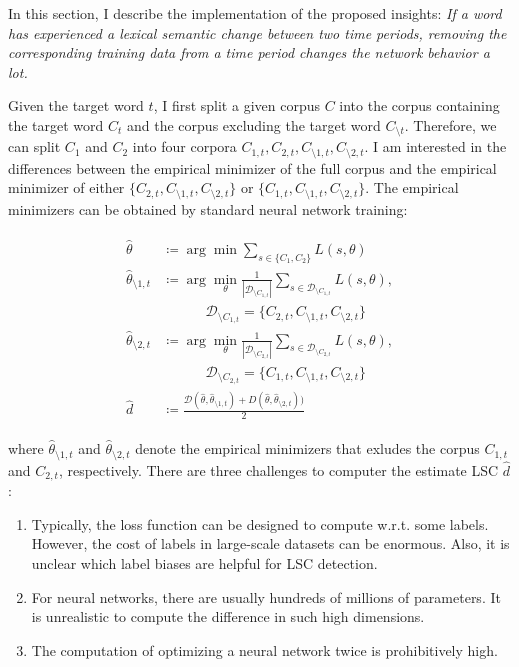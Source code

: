 In this section, I describe the implementation of the proposed insights: 
\textit{If a word has experienced a lexical semantic change between two time periods, removing the corresponding training data from a time period changes the network behavior a lot.}

Given the target word $t$, I first split a given corpus $C$ into the corpus containing the target word $C_{t}$ and the corpus excluding the target word $C_{\setminus t}$.
Therefore, we can split $C_1$ and $C_2$ into four corpora $C_{1, t}, C_{2, t}, C_{\setminus 1, t}, C_{\setminus 2, t}$.
I am interested in the differences between the empirical minimizer of the full corpus and the empirical minimizer of either 
$\{ C_{2, t}, C_{\setminus 1, t}, C_{\setminus 2, t} \}$ or $\{ C_{1, t}, C_{\setminus 1, t}, C_{\setminus 2, t} \}$.
The empirical minimizers can be obtained by standard neural network training:


\begin{align} 
\begin{split}
    \hat{\theta} &\coloneqq \arg\min \sum_{s \in\{C_1, C_2\}} L(s, \theta) \\
    \hat{\theta}_{\setminus 1, t} &\coloneqq \arg\min_\theta \frac{1}{|\mathcal{D}_{\setminus C_{1,t}}|} \sum_{s \in \mathcal{D}_{\setminus C_{1,t}}} L(s, \theta), \\
    & \ \ \ \ \ \ \ \ \ \ \ \ \ \  \mathcal{D}_{\setminus C_{1,t}} = \{C_{2, t}, C_{\setminus 1, t}, C_{\setminus 2, t}\} \\
    \hat{\theta}_{\setminus  2, t} &\coloneqq \arg\min_\theta \frac{1}{|\mathcal{D}_{\setminus C_{2,t}}|} \sum_{s \in \mathcal{D}_{\setminus C_{2,t}}} L(s, \theta), \\
    & \ \ \ \ \ \ \ \ \ \ \ \ \ \  \mathcal{D}_{\setminus C_{2,t}} = \{C_{1, t}, C_{\setminus 1, t}, C_{\setminus 2, t}\} \\
    \hat{d} &\coloneqq \frac{\mathcal{D}(\hat{\theta}, \hat{\theta}_{\setminus  1, t}) + D(\hat{\theta}, \hat{\theta}_{\setminus  2, t}))}{2}
    \label{eq:re-train-score}
\end{split}
\end{align}

\noindent where $\hat{\theta}_{\setminus 1, t}$ and $\hat{\theta}_{\setminus 2, t}$ denote the empirical minimizers that exludes the corpus $C_{1,t}$ and $C_{2,t}$, respectively.
There are three challenges to computer the estimate LSC $\hat{d}$: 
\begin{enumerate}
 \item Typically, the loss function can be designed to compute w.r.t. some labels.
 However, the cost of labels in large-scale datasets can be enormous. 
 Also, it is unclear which label biases are helpful for LSC detection.
 \item For neural networks, there are usually hundreds of millions of parameters.
 It is unrealistic to compute the difference in such high dimensions. 
 \item The computation of optimizing a neural network twice is prohibitively high.
\end{enumerate}

